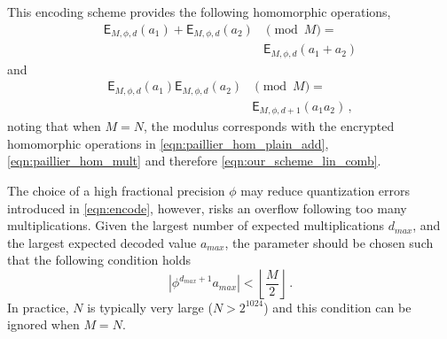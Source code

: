 \documentclass[10pt,letterpaper,oneside,twocolumn,journal]{IEEEtran}
\theoremstyle{definition}
\theoremstyle{definition}
\theoremstyle{remark}
\begin{document}
This encoding scheme provides the following homomorphic operations,
\begin{equation}
    \begin{split}
        \mathsf{E}_{M,\phi,d}(a_1) + \mathsf{E}_{M,\phi,d}(a_2)& \pmod{M} =\\
        &\mathsf{E}_{M,\phi,d}(a_1+a_2)
    \end{split}\label{eqn:encoding_homomorphic_add}
\end{equation}
and
\begin{equation}
    \begin{split}
        \mathsf{E}_{M,\phi,d}(a_1)\mathsf{E}_{M,\phi,d}(a_2)& \pmod{M} =\\
        &\mathsf{E}_{M,\phi,d+1}(a_1a_2)\,,
    \end{split}
\end{equation}
noting that when $M=N$, the modulus corresponds with the encrypted homomorphic operations in \eqref{eqn:paillier_hom_plain_add}, \eqref{eqn:paillier_hom_mult} and therefore \eqref{eqn:our_scheme_lin_comb}.

The choice of a high fractional precision $\phi$ may reduce quantization errors introduced in \eqref{eqn:encode}, however, risks an overflow following too many multiplications. Given the largest number of expected multiplications $d_{max}$, and the largest expected decoded value $a_{max}$, the parameter should be chosen such that the following condition holds
\begin{equation}
    \left|\phi^{d_{max}+1}a_{max}\right| < \left\lfloor \frac{M}{2} \right\rfloor\,.
\end{equation}
In practice, $N$ is typically very large ($N>2^{1024}$) and this condition can be ignored when $M=N$.

% 
% 
\end{document}
